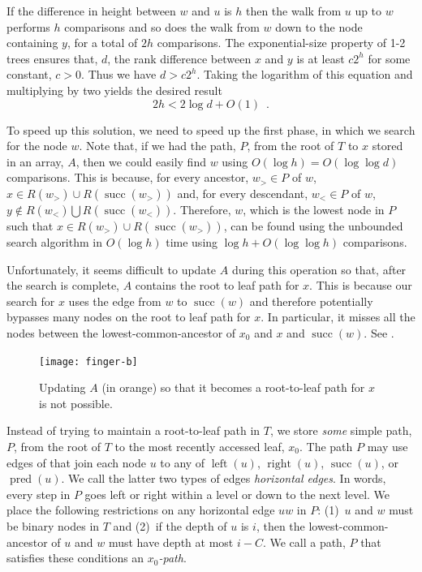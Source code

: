 \documentclass{patmorin}
\DeclareMathOperator{\scc}{succ}
\DeclareMathOperator{\pred}{pred}
\DeclareMathOperator{\lft}{left}
\DeclareMathOperator{\rght}{right}
\begin{document}
If the difference in height between $w$ and $u$ is $h$ then the walk
from $u$ up to $w$ performs $h$ comparisons and so does the walk from
$w$ down to the node containing $y$, for a total of $2h$ comparisons.
The exponential-size property of 1-2 trees ensures that,
$d$, the rank difference between $x$ and $y$ is at least $c2^h$ for some
constant, $c>0$.  Thus we have $d > c2^h$. Taking the logarithm of this
equation and multiplying by two yields the desired result
\[
  2h < 2\log d + O(1) \enspace .
\]

To speed up this solution, we need to speed up the first phase, in which
we search for the node $w$.  Note that, if we had the path, $P$, from the
root of $T$ to $x$ stored in an array, $A$, then we could easily find
$w$ using $O(\log h)=O(\log\log d)$ comparisons.  This is because, for
every ancestor, $w_>\in P$ of $w$, $x\in R(w_>)\cup R(\scc(w_>))$ and,
for every descendant, $w_<\in P$ of $w$, $y\not\in R(w_<)\bigcup
R(\scc(w_<))$.  Therefore, $w$, which is the lowest node in $P$ such that
$x\in R(w_>)\cup R(\scc(w_>))$, can be found using the unbounded search
algorithm in $O(\log h)$ time using $\log h+O(\log\log h)$ comparisons.

Unfortunately, it seems difficult to update $A$ during this operation
so that, after the search is complete, $A$ contains the root to leaf
path for $x$.  This is because our search for $x$ uses the edge from
$w$ to $\scc(w)$ and therefore potentially bypasses many nodes on the
root to leaf path for $x$.  In particular, it misses all the nodes
between the lowest-common-ancestor of $x_0$ and $x$ and $\scc(w)$.
See .

\begin{figure}
  \begin{center}
    \texttt{[image: finger-b]}
  \end{center}
  \caption{Updating $A$ (in orange) so that it becomes a root-to-leaf path
      for $x$ is not possible.}
\end{figure}

Instead of trying to maintain a root-to-leaf path in $T$, we store
\emph{some} simple path, $P$, from the root of $T$ to the most recently
accessed leaf, $x_0$.  The path $P$ may use edges of that join each node
$u$ to any of $\lft(u)$, $\rght(u)$, $\scc(u)$, or $\pred(u)$. We call
the latter two types of edges \emph{horizontal edges}.  In words, every
step in $P$ goes left or right within a level or down to the next level.
We place the following restrictions on any horizontal edge $uw$ in $P$:
(1)~$u$ and $w$ must be binary nodes in $T$ and (2)~if the depth of $u$
is $i$, then the lowest-common-ancestor of $u$ and $w$ must have depth
at most $i-C$.  We call a path, $P$ that satisfies these conditions an
\emph{$x_0$-path}.
\end{document}
